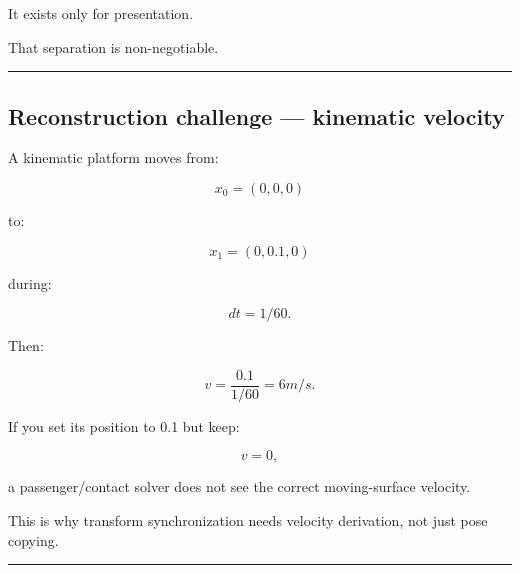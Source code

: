 It exists only for presentation.

That separation is non-negotiable.

\begin{center}\rule{0.5\linewidth}{0.5pt}\end{center}

\subsection{Reconstruction challenge --- kinematic velocity}\label{06-engine-ii-ch038-reconstruction-challenge-kinematic-velocity}

\hypertarget{06-engine-ii-ch038-reconstruction-challenge-kinematic-velocity}{}

A kinematic platform moves from:

\[
x_0=(0,0,0)
\]

to:

\[
x_1=(0,0.1,0)
\]

during:

\[
dt=1/60.
\]

Then:

\[
v
=
\frac{0.1}{1/60}
=
6m/s.
\]

If you set its position to 0.1 but keep:

\[
v=0,
\]

a passenger/contact solver does not see the correct moving-surface velocity.

This is why transform synchronization needs velocity derivation, not just pose copying.

\begin{center}\rule{0.5\linewidth}{0.5pt}\end{center}

